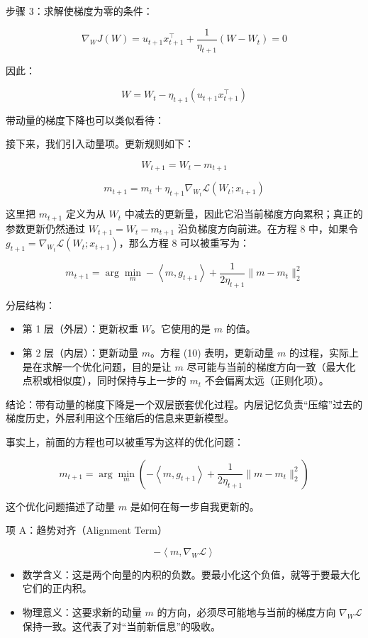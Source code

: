 步骤 3：求解使梯度为零的条件：

\[
\nabla_W J(W)=u_{t+1}x_{t+1}^{\top}+\frac{1}{\eta_{t+1}}(W-W_t)=0
\]

因此：

\[
W=W_t-\eta_{t+1}(u_{t+1}x_{t+1}^{\top})
\]

带动量的梯度下降也可以类似看待：

接下来，我们引入动量项。更新规则如下：

\[
W_{t+1}=W_t-m_{t+1}
\tag{7}
\]

\[
m_{t+1}=m_t+\eta_{t+1}\nabla_{W_t}\mathcal{L}(W_t;x_{t+1})
\tag{8}
\]

这里把 \(m_{t+1}\) 定义为从 \(W_t\) 中减去的更新量，因此它沿当前梯度方向累积；真正的参数更新仍然通过 \(W_{t+1}=W_t-m_{t+1}\) 沿负梯度方向前进。在方程 8 中，如果令 \(g_{t+1}=\nabla_{W_t}\mathcal{L}(W_t;x_{t+1})\)，那么方程 8 可以被重写为：

\[
m_{t+1}=\arg\min_m-\left\langle m,g_{t+1}\right\rangle
+\frac{1}{2\eta_{t+1}}\lVert m-m_t\rVert_2^2
\tag{10}
\]

分层结构：

\begin{itemize}
\tightlist
\item
  第 1 层（外层）：更新权重 \(W\)。它使用的是 \(m\) 的值。
\item
  第 2 层（内层）：更新动量 \(m\)。方程 (10) 表明，更新动量 \(m\) 的过程，实际上是在求解一个优化问题，目的是让 \(m\) 尽可能与当前的梯度方向一致（最大化点积或相似度），同时保持与上一步的 \(m_t\) 不会偏离太远（正则化项）。
\end{itemize}

结论：带有动量的梯度下降是一个双层嵌套优化过程。内层记忆负责``压缩''过去的梯度历史，外层利用这个压缩后的信息来更新模型。

事实上，前面的方程也可以被重写为这样的优化问题：

\[
m_{t+1}=\arg\min_m\left(
-\left\langle m,g_{t+1}\right\rangle
+\frac{1}{2\eta_{t+1}}\lVert m-m_t\rVert_2^2
\right)
\tag{10}
\]

这个优化问题描述了动量 \(m\) 是如何在每一步自我更新的。

项 A：趋势对齐（Alignment Term）

\[
-\left\langle m,\nabla_W\mathcal{L}\right\rangle
\]

\begin{itemize}
\tightlist
\item
  数学含义：这是两个向量的内积的负数。要最小化这个负值，就等于要最大化它们的正内积。
\item
  物理意义：这要求新的动量 \(m\) 的方向，必须尽可能地与当前的梯度方向 \(\nabla_W\mathcal{L}\) 保持一致。这代表了对``当前新信息''的吸收。
\end{itemize}

